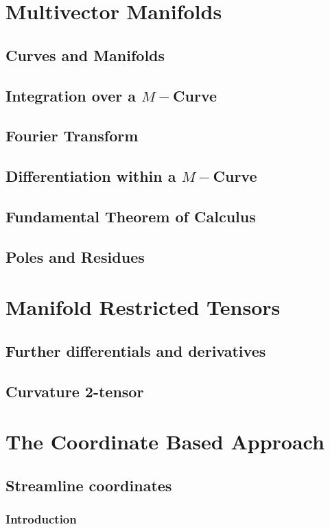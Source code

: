 \documentclass[a4paper]{book}
\numberwithin{equation}{chapter}
\begin{document}
\chapter{Multivector Manifolds}
\section{Curves and Manifolds}
\section{Integration over a $M-$Curve}
\section{Fourier Transform}
\section{Differentiation within a $M-$Curve}
\section{Fundamental Theorem of Calculus}
\section{Poles and Residues}

\chapter{Manifold Restricted Tensors}
\section{Further differentials and derivatives}
\section{Curvature 2-tensor}





\chapter{The Coordinate Based Approach}

\section{Streamline coordinates}
\subsection{Introduction}
\end{document}
